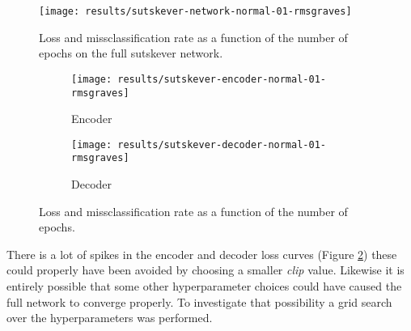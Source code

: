 \begin{figure}[h]
	\centering
	\texttt{[image: results/sutskever-network-normal-01-rmsgraves]}
	\caption{Loss and missclassification rate as a function of the number of epochs on the full sutskever network.}
	\label{fig:results:sutskever:network-01}
\end{figure}
\begin{figure}[H]
        \vspace{-0.5cm}
        \centering
        \begin{subfigure}[b]{0.49\textwidth}
                \texttt{[image: results/sutskever-encoder-normal-01-rmsgraves]}
                \caption{Encoder}
        \end{subfigure}
        \begin{subfigure}[b]{0.49\textwidth}
                \texttt{[image: results/sutskever-decoder-normal-01-rmsgraves]}
                \caption{Decoder}
        \end{subfigure}
        \caption{Loss and missclassification rate as a function of the number of epochs.}
        \label{fig:results:sutskever:decoder-encoder-01}
\end{figure}

There is a lot of spikes in the encoder and decoder loss curves (Figure \ref{fig:results:sutskever:decoder-encoder-01}) these could properly have been avoided by choosing a smaller \textit{clip} value. Likewise it is entirely possible that some other hyperparameter choices could have caused the full network to converge properly. To investigate that possibility a grid search over the hyperparameters was performed.

